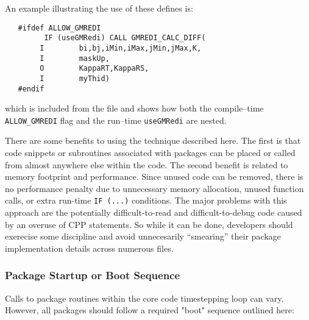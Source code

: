An example illustrating the use of these defines is:
\begin{verbatim}
   #ifdef ALLOW_GMREDI
         IF (useGMRedi) CALL GMREDI_CALC_DIFF(
        I        bi,bj,iMin,iMax,jMin,jMax,K,
        I        maskUp,
        O        KappaRT,KappaRS,
        I        myThid)
   #endif
\end{verbatim}
which is included from the file
and shows how both the compile--time \texttt{ALLOW\_GMREDI} flag and the
run--time \texttt{useGMRedi} are nested.

There are some benefits to using the technique described here.  The
first is that code snippets or subroutines associated with packages
can be placed or called from almost anywhere else within the code.
The second benefit is related to memory footprint and performance.
Since unused code can be removed, there is no performance penalty due
to unnecessary memory allocation, unused function calls, or extra
run-time \texttt{IF (...)} conditions.  The major problems with this
approach are the potentially difficult-to-read and difficult-to-debug
code caused by an overuse of CPP statements.  So while it can be done,
developers should exerecise some discipline and avoid unnecesarily
``smearing'' their package implementation details across numerous
files.


\subsubsection{Package Startup or Boot Sequence}

Calls to package routines within the core code timestepping loop can
vary.  However, all packages should follow a required "boot" sequence
outlined here:

